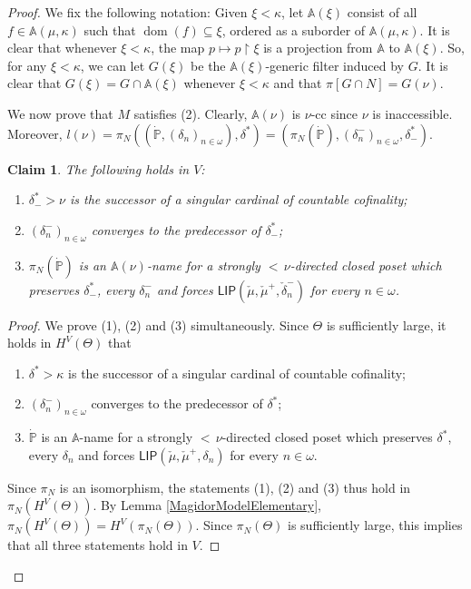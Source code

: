 \documentclass[a4paper]{amsart}
\theoremstyle{definition}
\theoremstyle{remark}
\theoremstyle{plain}
\newtheorem{myclaim}{Claim}
\numberwithin{mydef}{section}
\DeclareMathOperator{\dom}{dom}
\newcommand{\dA}{\mathbb{A}}
\newcommand{\dP}{\mathbb{P}}
\newcommand{\uhr}{\upharpoonright}
\newcommand{\LIP}{\mathsf{LIP}}
\begin{document}
\begin{proof}
		We fix the following notation: Given $\xi<\kappa$, let $\dA(\xi)$ consist of all $f\in\dA(\mu,\kappa)$ such that $\dom(f)\subseteq\xi$, ordered as a suborder of $\dA(\mu,\kappa)$. It is clear that whenever $\xi<\kappa$, the map $p\mapsto p\uhr\xi$ is a projection from $\dA$ to $\dA(\xi)$. So, for any $\xi<\kappa$, we can let $G(\xi)$ be the $\dA(\xi)$-generic filter induced by $G$. It is clear that $G(\xi)=G\cap\dA(\xi)$ whenever $\xi<\kappa$ and that $\pi[G\cap N]=G(\nu)$.
		
		We now prove that $M$ satisfies (2). Clearly, $\dA(\nu)$ is $\nu$-cc since $\nu$ is inaccessible. Moreover, $l(\nu)=\pi_N((\dot{\dP},(\delta_n)_{n\in\omega}),\delta^*)=(\pi_N(\dot{\dP}),(\delta_n^-)_{n\in\omega},\delta^*_-)$.
		
		\begin{myclaim}
			The following holds in $V$:
			\begin{enumerate}
				\item $\delta^*_->\nu$ is the successor of a singular cardinal of countable cofinality;
				\item $(\delta_n^-)_{n\in\omega}$ converges to the predecessor of $\delta^*_-$;
				\item $\pi_N(\dot{\dP})$ is an $\dA(\nu)$-name for a strongly ${<}\,\nu$-directed closed poset which preserves $\delta^*_-$, every $\delta_n^-$ and forces $\LIP(\check{\mu},\check{\mu}^+,\check{\delta}_n^-)$ for every $n\in\omega$.
			\end{enumerate}
		\end{myclaim}
		
		\begin{proof}
			We prove (1), (2) and (3) simultaneously. Since $\Theta$ is sufficiently large, it holds in $H^V(\Theta)$ that
			\begin{enumerate}
				\item $\delta^*>\kappa$ is the successor of a singular cardinal of countable cofinality;
				\item $(\delta_n^-)_{n\in\omega}$ converges to the predecessor of $\delta^*$;
				\item $\dot{\dP}$ is an $\dA$-name for a strongly ${<}\,\nu$-directed closed poset which preserves $\delta^*$, every $\delta_n$ and forces $\LIP(\check{\mu},\check{\mu}^+,\delta_n)$ for every $n\in\omega$.
			\end{enumerate}
			
			Since $\pi_N$ is an isomorphism, the statements (1), (2) and (3) thus hold in $\pi_N(H^V(\Theta))$. By Lemma \ref{MagidorModelElementary}, $\pi_N(H^V(\Theta))=H^V(\pi_N(\Theta))$. Since $\pi_N(\Theta)$ is sufficiently large, this implies that all three statements hold in $V$.
		\end{proof}
		

\end{proof}
\end{document}
